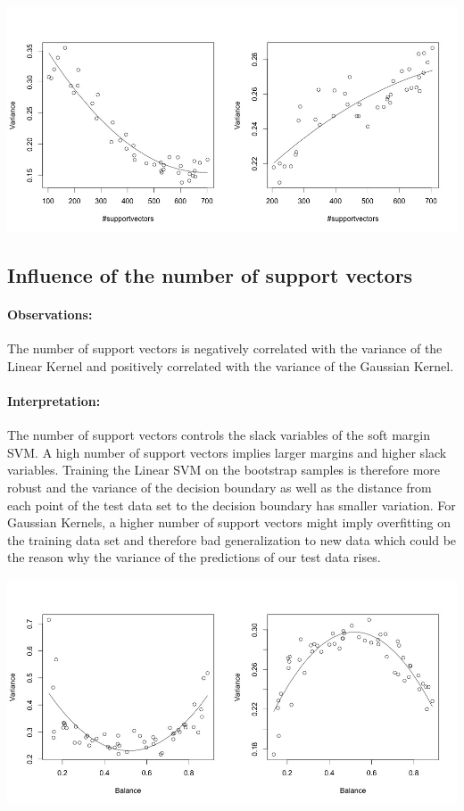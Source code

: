 \documentclass[a1,portrait]{a0poster}
\begin{document}
\begin{multicols}{3}
\begin{center}\vspace{1cm}
\includegraphics[width=1\linewidth]{abb/n_support.jpg}
\label{fig4}
\end{center}\vspace{1cm}


\subsection*{Influence of the number of support vectors}
\paragraph{Observations:}
The number of support vectors is negatively correlated with the variance of the Linear Kernel and positively correlated with the variance of the Gaussian Kernel.
\paragraph{Interpretation:}
The number of support vectors controls the slack variables of the soft margin SVM. A high number of support vectors implies larger margins and higher slack variables. Training the Linear SVM on the bootstrap samples is therefore more robust and the variance of the decision boundary as well as the distance from each point of the test data set to the decision boundary has smaller variation.
For Gaussian Kernels, a higher number of support vectors might imply overfitting on the training data set and therefore bad generalization to new data which could be the reason why the variance of the predictions of our test data rises.

\begin{center}\vspace{1cm}
\includegraphics[width=1\linewidth]{abb/balance.jpg}


\end{center}
\end{multicols}
\end{document}
